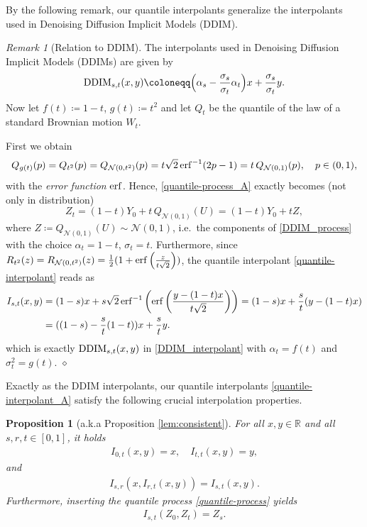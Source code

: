 \documentclass{article}
\theoremstyle{plain}
\newtheorem{proposition}[theorem]{Proposition}
\theoremstyle{definition}
\theoremstyle{remark}
\newtheorem{remark}[theorem]{Remark}
\begin{document}
By the following remark, our quantile interpolants generalize the interpolants used in Denoising Diffusion Implicit Models (DDIM).
\begin{remark}[Relation to DDIM] \label{rem:ddim}
The interpolants used in Denoising Diffusion Implicit Models (DDIMs) \cite{DDIM2020} are given by
\begin{equation}\label{DDIM_interpolant}
    {\rm DDIM}_{s,t}(x,y)   \coloneqq \Big(\alpha_s - \frac{\sigma_s}{\sigma_t}\alpha_t \Big) x + \frac{\sigma_s}{\sigma_t} y.
\end{equation}
Now let $f(t) \coloneqq 1-t$,  $g(t) \coloneqq t^2$ and let $Q_t$ be the quantile of the law of a standard Brownian motion $W_t$.

First we obtain
\begin{equation}
   Q_{g(t)}(p) = Q_{t^2}(p) = Q_{\mathcal{N}(0, t^2)}(p)
   = t\sqrt{2} \, {\rm erf}^{-1} (2p-1)
   = t \, Q_{\mathcal{N}(0, 1)}(p), \quad p\in (0,1),
\end{equation}
with the \emph{error function} ${\rm erf}$.
Hence, \eqref{quantile-process_A} exactly becomes (not only in distribution)
\begin{equation}
    Z_t = (1-t) Y_0 + t \, Q_{\mathcal{N}(0, 1)}(U)
    = (1-t) Y_0 + t Z,
\end{equation}
where $Z \coloneqq Q_{\mathcal{N}(0, 1)}(U) \sim \mathcal{N}(0, 1)$, i.e.\ the components of \eqref{DDIM_process} with the choice $\alpha_t = 1-t$, $\sigma_t =t$. 
Furthermore, since $R_{t^2}(z) = R_{\mathcal{N}(0, t^2)}(z) = \frac{1}{2}(1 + {\rm erf}\left( \frac{z}{t\sqrt{2}} \right))$, the quantile interpolant \eqref{quantile-interpolant} reads as
\begin{align}
   I_{s,t}(x, y) &= (1-s) x + s \sqrt{2} \, {\rm erf}^{-1} \left( {\rm erf} \left(\frac{y - (1-t)x}{t \sqrt{2}} \right) \right) 
   = (1-s) x + \frac{s}{t} (y - (1-t)x)\\
   &= ( (1-s) - \frac{s}{t}(1-t)) x + \frac{s}{t}y. \quad 
\end{align}
which is exactly  ${\rm DDIM}_{s,t}(x,y)$  in \eqref{DDIM_interpolant} with $\alpha_t = f(t)$ and $\sigma_t^2 = g(t)$. $\diamond$
\end{remark}

Exactly as the DDIM interpolants, our quantile interpolants \eqref{quantile-interpolant_A} satisfy the following crucial interpolation properties.

\begin{proposition}[a.k.a Proposition \ref{lem:consistent}] \label{lem:consistent_A}
For all $ x, y \in \mathbb{R}$ and all $s,r,t \in [0,1]$, it holds
\begin{align}\label{cons-left-right}
   I_{0,t}(x, y) = x, \quad I_{t,t}(x, y) =  y,
\end{align}
and 
\begin{align}\label{cons-int-int}
    I_{s,r}(x,  I_{r,t}(x,y)) 
    = I_{s,t}(x,y) .
\end{align}
Furthermore, inserting the quantile process \eqref{quantile-process} yields
\begin{align}\label{interpolation2}
    I_{s,t}(Z_0, Z_t) = Z_s.
\end{align}
\end{proposition}
\end{document}
